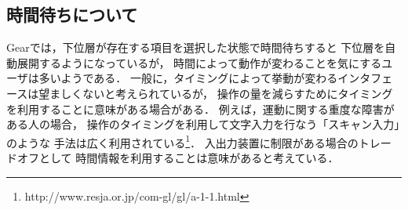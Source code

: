 \documentclass[twoside]{wiss}
\def\GEAR{\textsf{Gear}}
\begin{document}

% 

% 


\subsection{時間待ちについて}

{\GEAR}では，下位層が存在する項目を選択した状態で時間待ちすると
下位層を自動展開するようになっているが，
時間によって動作が変わることを気にするユーザは多いようである．
%
一般に，タイミングによって挙動が変わるインタフェースは望ましくないと考えられているが，
操作の量を減らすためにタイミングを利用することに意味がある場合がある．
例えば，運動に関する重度な障害がある人の場合，
操作のタイミングを利用して文字入力を行なう「スキャン入力」のような
手法は広く利用されている\footnote{
  \textsf{http://www.resja.or.jp/com-gl/gl/a-1-1.html}
}．
入出力装置に制限がある場合のトレードオフとして
時間情報を利用することは意味があると考えている．

\end{document}
